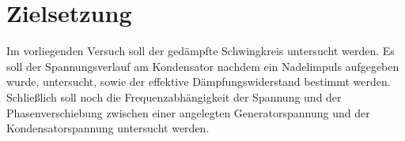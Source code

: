 \section{Zielsetzung}
\label{sec:Zielsetzung}
Im vorliegenden Versuch soll der gedämpfte Schwingkreis untersucht werden.
Es soll der Spannungsverlauf am Kondensator nachdem ein Nadelimpuls aufgegeben wurde, untersucht, sowie der effektive Dämpfungswiderstand bestimmt werden. \\
Schließlich soll noch die Frequenzabhängigkeit der Spannung und der Phasenverschiebung zwischen einer angelegten Generatorspannung und der Kondensatorspannung untersucht werden.

